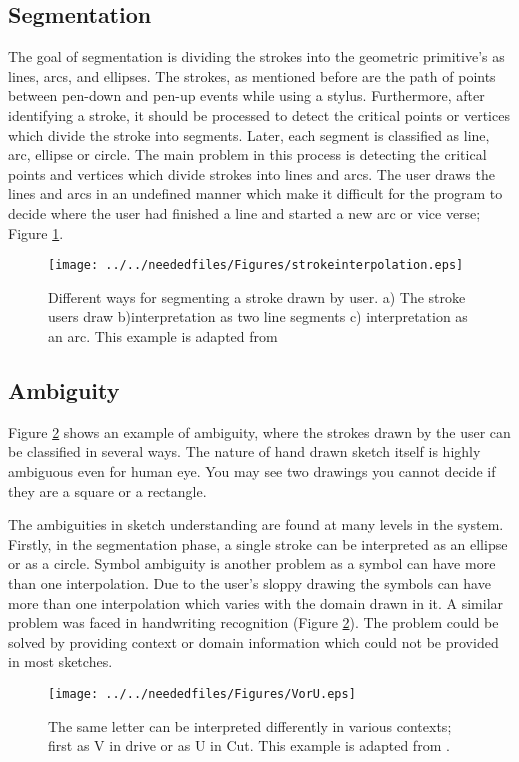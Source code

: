\subsection {Segmentation}
The goal of segmentation is dividing the strokes into the geometric primitive's as lines, arcs, and ellipses. The strokes, as mentioned before are the path of points between pen-down and pen-up events while using a stylus. Furthermore, after identifying a stroke, it should be processed to detect the critical points or vertices which divide the stroke into segments. Later, each segment is classified as line, arc, ellipse or circle. The main problem in this process is detecting the critical points and vertices which divide strokes into lines and arcs. The user draws the lines and arcs in an undefined manner which make it difficult for the program to decide where the user had finished a line and started a new arc or vice verse;  Figure \ref {fig:strokeinterpolation}.
\begin{figure}

\begin{center}
		\texttt{[image: ../../neededfiles/Figures/strokeinterpolation.eps]}
	\caption[Segmentation Error]{Different ways for segmenting a stroke drawn by user. a) The stroke users draw b)interpretation as two line segments c) interpretation as an arc. This example is adapted from \cite{earlyprocess}}
	\label{fig:strokeinterpolation}
\end{center}
\end{figure}

\subsection{Ambiguity}
Figure \ref{fig:VorU} shows an example of ambiguity, where the strokes drawn by the user can be classified in several ways. The nature of hand drawn sketch itself is highly ambiguous even for human eye. You may see two drawings you cannot decide if they are a square or a rectangle.

The ambiguities in sketch understanding are found at many levels in the system. Firstly, in the segmentation phase, a single stroke can be interpreted as an ellipse or as a circle. Symbol ambiguity is another problem as a symbol can have more than one interpolation. Due to the user's sloppy drawing the symbols can have more than one interpolation which varies with the domain drawn in it. A similar problem was faced in handwriting recognition (Figure \ref{fig:VorU}). The problem could be solved by providing context or domain information which could not be provided in most sketches. 
\begin{figure}	
	\centering
		\texttt{[image: ../../neededfiles/Figures/VorU.eps]}
	\caption[Handwriting Ambiguities] { The same letter can be interpreted differently in various contexts; first as V in drive or as U in Cut. This example is adapted from \cite{Ambiguity}.}
\label{fig:VorU}
\end{figure} 	

